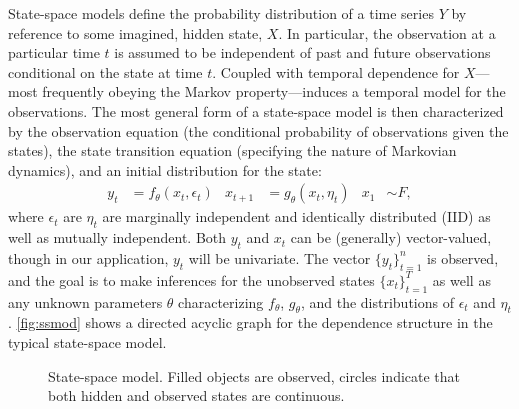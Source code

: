 \documentclass[12pt]{article}
\begin{document}
State-space models define the probability distribution of a time 
series $Y$ by reference to some imagined, hidden state, $X$. In
particular, the observation at a particular time $t$ is assumed to be
independent of past and future observations conditional on the state
at time $t$. Coupled with temporal dependence for $X$---most
frequently obeying the Markov property---induces a temporal model for
the observations.  The most general form of a state-space model is
then characterized by the 
observation equation (the conditional probability of observations
given the states),
the state transition equation (specifying the nature of Markovian
dynamics), and an initial distribution for the state: 
\begin{align}
  y_t &= f_\theta(x_t,\epsilon_t) &
  x_{t+1} &= g_\theta(x_{t},\eta_t) &
  x_1 &\sim F,\label{eq:ssmod}
\end{align}
where $\epsilon_t$ are $\eta_t$ are marginally independent and
identically distributed (IID) as well as mutually independent. Both
$y_t$ and $x_t$ can be (generally) vector-valued, though in our
application, $y_t$ will be univariate. The
vector $\{y_t\}_{t=1}^n$ is observed, and the goal is to make
inferences for the unobserved states $\{x_t\}_{t=1}^T$ as well as any
unknown parameters $\theta$ characterizing $f_\theta$, $g_\theta$, and
the distributions of $\epsilon_t$ and $\eta_t$.  \autoref{fig:ssmod}
shows a directed acyclic graph for the dependence structure in the
typical state-space model.

\begin{figure}
  \centering
  \caption{State-space model. Filled objects are observed, circles
    indicate that both hidden and observed states are
    continuous.\label{fig:ssmod}} 
\end{figure}
\end{document}
